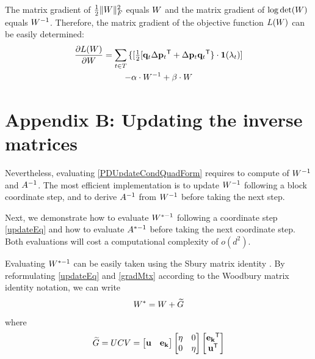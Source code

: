 \documentclass{article}
\begin{document}
{The matrix gradient of $\tfrac{1}{2} \| {W} \|_{F}^{2}$ equals ${W}$ and the matrix gradient of  $\log \det({W})$ equals ${W}^{-1}$. Therefore, the matrix gradient of the objective function $L({W})$ can be easily determined: 
\begin{multline}
\frac{\partial {L ({W})}}{\partial {W}} = 
\sum\limits_{t\in T}{\{ [\tfrac{1}{2}[\mathbf{q}_{t}\Delta\mathbf{p}_{t}{}^\mathsf{T} + \Delta\mathbf{p}_{t}\mathbf{q}_{t}{}^\mathsf{T} \} } \cdot \textbf{1}(\lambda_t)] \\- \alpha \cdot {W}^{-1} + \beta \cdot {W} 
\label{gradMat}
\end{multline}


\section*{Appendix B: Updating the inverse matrices}
\label{appendix-inverse}

Nevertheless, evaluating \eqref{PDUpdateCondQuadForm} requires to
compute of ${W}^{-1}$ and ${A}^{-1}$. The most efficient
implementation is to update ${W}^{-1}$ following a block coordinate
step, and to derive ${A}^{-1}$ from ${W}^{-1}$ before taking the
next step.


Next, we demonstrate how to evaluate ${W}^{*-1}$ following a coordinate
step \eqref{updateEq} and how to evaluate ${A}^{*-1}$ before
taking the next coordinate step. Both evaluations will cost a
computational complexity of $o(d^2)$.

Evaluating ${W}^{*-1}$ can be easily taken using the Sbury matrix
identity . By reformulating \eqref{updateEq} and
\eqref{gradMtx} according to the Woodbury matrix identity notation, we
can write
\begin{equation}
  {W^*} = {W}+{\widetilde{G}}
  \label{updateEqWDB}
\end{equation}
where
\begin{equation}
  {\widetilde{G}} = {U}{C}{V} = \left[ \begin{matrix}
      \mathbf{u} & \mathbf{e_k} \end{matrix} \right] \left[ \begin{matrix}
      \eta & 0 \\ 0 & \eta \end{matrix} \right] \left[ \begin{matrix}
      \mathbf{e_k}{}^\mathsf{T} \\ \mathbf{u}{}^\mathsf{T} \end{matrix} \right]
  \label{gradMtxWDB}
\end{equation}

}
\end{document}
